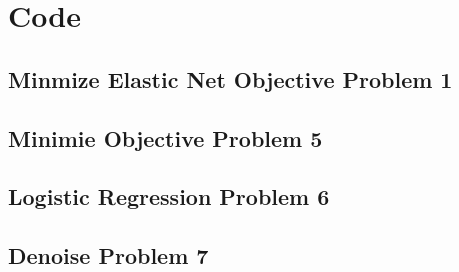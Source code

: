 \documentclass[11pt]{article}
\begin{document}
\section{Code}
\subsection{Minmize Elastic Net Objective Problem 1}

\subsection{Minimie Objective Problem 5}


\subsection{Logistic Regression Problem 6}

\subsection{Denoise Problem 7}

\end{document}
